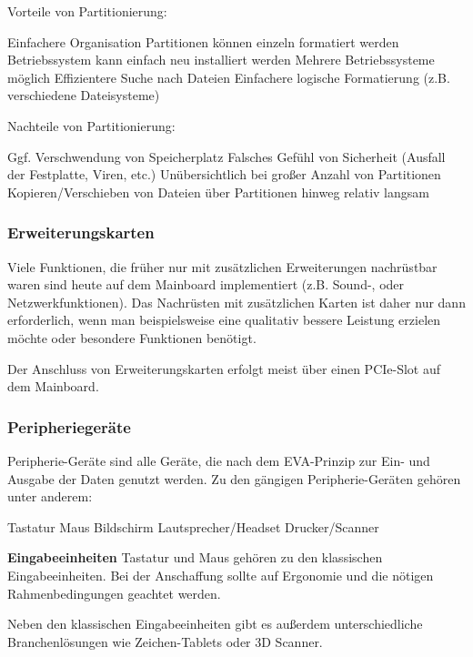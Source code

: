 \documentclass[asp1.tex]{subfiles}
\begin{document}
Vorteile von Partitionierung:
\begin{outline}
    \1 Einfachere Organisation
    \1 Partitionen können einzeln formatiert werden
    \1 Betriebssystem kann einfach neu installiert werden
    \1 Mehrere Betriebssysteme möglich
    \1 Effizientere Suche nach Dateien
    \1 Einfachere logische Formatierung (z.B. verschiedene Dateisysteme)
\end{outline}

Nachteile von Partitionierung:
\begin{outline}
    \1 Ggf. Verschwendung von Speicherplatz
    \1 Falsches Gefühl von Sicherheit (Ausfall der Festplatte, Viren, etc.)
    \1 Unübersichtlich bei großer Anzahl von Partitionen
    \1 Kopieren/Verschieben von Dateien über Partitionen hinweg relativ langsam
\end{outline}

\subsubsection{Erweiterungskarten}
Viele Funktionen, die früher nur mit zusätzlichen Erweiterungen nachrüstbar waren sind heute auf dem Mainboard implementiert (z.B. Sound-, oder Netzwerkfunktionen). Das Nachrüsten mit zusätzlichen Karten ist daher nur dann erforderlich, wenn man beispielsweise eine qualitativ bessere Leistung erzielen möchte oder besondere Funktionen benötigt.

Der Anschluss von Erweiterungskarten erfolgt meist über einen PCIe-Slot auf dem Mainboard.

\subsubsection{Peripheriegeräte}
Peripherie-Geräte sind alle Geräte, die nach dem EVA-Prinzip zur Ein- und Ausgabe der Daten genutzt werden. Zu den gängigen Peripherie-Geräten gehören unter anderem:
\begin{outline}
    \1 Tastatur
    \1 Maus
    \1 Bildschirm
    \1 Lautsprecher/Headset
    \1 Drucker/Scanner
\end{outline}

\textbf{Eingabeeinheiten}
Tastatur und Maus gehören zu den klassischen Eingabeeinheiten. Bei der Anschaffung sollte auf Ergonomie und die nötigen Rahmenbedingungen geachtet werden.

Neben den klassischen Eingabeeinheiten gibt es außerdem unterschiedliche Branchenlösungen wie Zeichen-Tablets oder 3D Scanner.
\end{document}
